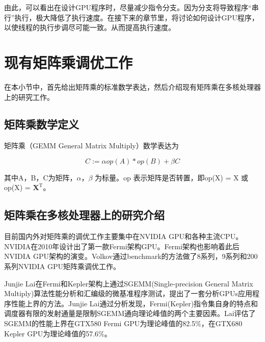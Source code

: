 由此，可以看出在设计GPU程序时，尽量减少指令分支。因为分支将导致程序“串行”执行，极大降低了执行速度。在接下来的章节里，将讨论如何设计GPU程序，以使线程的执行步调尽可能一致。从而提高执行速度。

\section{现有矩阵乘调优工作}
在本小节中，首先给出矩阵乘的标准数学表达，然后介绍现有矩阵乘在多核处理器上的研究工作。

\subsection{矩阵乘数学定义}
矩阵乘（GEMM General Matrix Multiply）数学表达为

\begin{equation}
	C:= \alpha op(A)*op(B) + \beta C
\end{equation}

其中A，B，C为矩阵，$\alpha$，$\beta$ 为标量。op 表示矩阵是否转置，即op(X) = X 或 op(X) = $\mathbf{X}^\mathrm{T}$。

\subsection{矩阵乘在多核处理器上的研究介绍}
目前国内外对矩阵乘的调优工作主要集中在NVIDIA GPU和各种主流CPU。NVIDIA在2010年设计出了第一款Fermi架构GPU。Fermi架构也影响着此后NVIDIA GPU架构的演变。Volkov通过benchmark的方法做了8系列，9系列和200系列NVIDIA GPU矩阵乘调优工作。

Junjie Lai在Fermi和Kepler架构上通过SGEMM(Single-precision General Matrix Multiply)算法性能分析和汇编级的微基准程序测试，提出了一套分析GPUs应用程序性能上界的方法。Junjie Lai通过分析发现，Fermi(Kepler)指令集自身的特点和调度器有限的发射通量是限制SGEMM通向理论峰值的两个主要因素。Lai评估了SGEMM的性能上界在GTX580 Fermi GPU为理论峰值的82.5\%，在GTX680 Kepler GPU为理论峰值的57.6\%。

